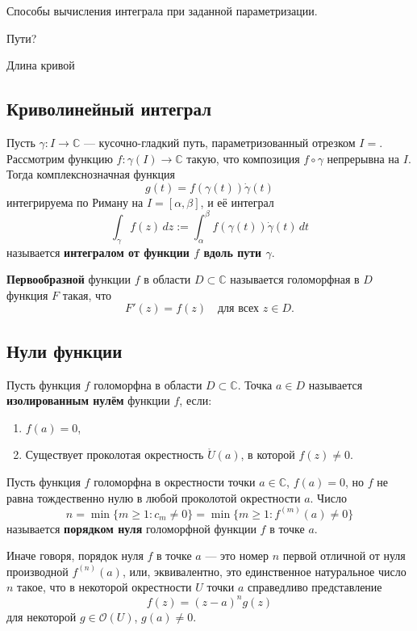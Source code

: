 Способы вычисления интеграла при заданной параметризации.

Пути?

Длина кривой

\subsection{Криволинейный интеграл}

\begin{definition}
Пусть $\gamma: I \to \mathbb{C}$ --- кусочно-гладкий путь, параметризованный отрезком $I = $. Рассмотрим функцию $f: \gamma(I) \to \mathbb{C}$ такую, что композиция $f \circ \gamma$ непрерывна на $I$. Тогда комплекснозначная функция
\[
g(t) = f(\gamma(t)) \dot{\gamma}(t)
\]
интегрируема по Риману на $I = [\alpha, \beta]$, и её интеграл
\[
\int_{\gamma} f(z) \, dz := \int_{\alpha}^{\beta} f(\gamma(t)) \dot{\gamma}(t) \, dt
\]
называется \textbf{интегралом от функции $f$ вдоль пути $\gamma$}.
\end{definition}

\begin{definition}
\textbf{Первообразной} функции $f$ в области $D \subset \mathbb{C}$ называется голоморфная в $D$ функция $F$ такая, что
\[
F'(z) = f(z) \quad \text{для всех } z \in D.
\]
\end{definition}

\subsection{Нули функции}

\begin{definition}
Пусть функция $f$ голоморфна в области $D \subset \mathbb{C}$. Точка $a \in D$ называется \textbf{изолированным нулём} функции $f$, если:
\begin{enumerate}
    \item $f(a) = 0$,
    \item Существует проколотая окрестность $\mathring{U}(a)$, в которой $f(z) \neq 0$.
\end{enumerate}
\end{definition}

\begin{definition}
Пусть функция $f$ голоморфна в окрестности точки $a \in \mathbb{C}$, $f(a) = 0$, но $f$ не равна тождественно нулю в любой проколотой окрестности $a$. Число
\[
n = \min\{m \geq 1 : c_m \neq 0\} = \min\{m \geq 1 : f^{(m)}(a) \neq 0\}
\]
называется \textbf{порядком нуля} голоморфной функции $f$ в точке $a$.

Иначе говоря, порядок нуля $f$ в точке $a$ --- это номер $n$ первой отличной от нуля производной $f^{(n)}(a)$, или, эквивалентно, это единственное натуральное число $n$ такое, что в некоторой окрестности $U$ точки $a$ справедливо представление
\[
f(z) = (z - a)^n g(z)
\]
для некоторой $g \in \mathcal{O}(U)$, $g(a) \neq 0$.
\end{definition}

